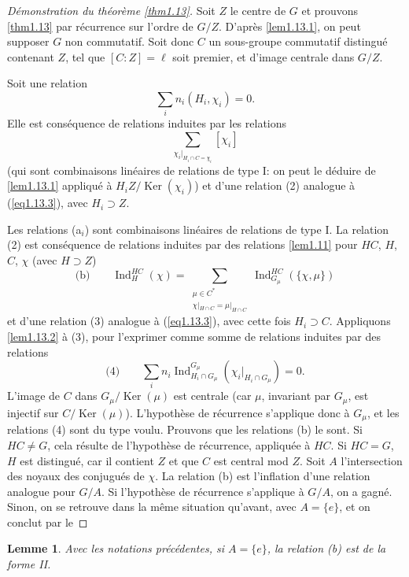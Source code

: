 \documentclass[11pt,a4paper]{amsart}
\theoremstyle{plain}
\newtheorem{lemma}[theorem]{Lemme}
\theoremstyle{definition}
\DeclareMathOperator{\Ind}{Ind}
\DeclareMathOperator{\Ker}{Ker}
\begin{document}
\begin{proof}[D\'emonstration du th\'eor\`eme \ref{thm1.13}]
Soit $Z$ le centre de $G$ et prouvons \ref{thm1.13} par r\'ecurrence sur l'ordre de $G/Z$. D'apr\`es \ref{lem1.13.1}, on peut supposer $G$ non commutatif. Soit donc $C$ un sous-groupe commutatif distingu\'e contenant $Z$, tel que $[C:Z] = \ell$ soit premier, et d'image centrale dans $G/Z$.

Soit une relation
\begin{equation}\label{eq1.13.3}
\sum_{i} n_{i} (H_{i},\chi_{i}) = 0.
\end{equation}
Elle est cons\'equence de relations induites par les relations
\[
\sum_{\chi_{i}|_{H_{i} \cap C = \chi_{i}}} [\chi_{i}]
\]
(qui sont combinaisons lin\'eaires de relations de type I: on peut le d\'eduire de \ref{lem1.13.1} appliqu\'e \`a $H_{i}Z/\Ker(\chi_{i})$) et d'une relation (2) analogue \`a (\ref{eq1.13.3}), avec $H_{i} \supset Z$.

Les relations (a$_{i}$) sont combinaisons lin\'eaires de relations de type I. La relation (2) est cons\'equence de relations induites par des relations \ref{lem1.11} pour $HC$, $H$, $C$, $\chi$ (avec $H \supset Z$)
\[
\text{(b)} \qquad \Ind_{H}^{HC}(\chi) = \sum_{\substack{\mu \in C^{*} \\ \chi|_{H \cap C} = \mu|_{H \cap C}}} \Ind_{G_{\mu}}^{HC}(\{\chi,\mu\})
\]
et d'une relation (3) analogue \`a (\ref{eq1.13.3}), avec cette fois $H_{i} \supset C$. Appliquons \ref{lem1.13.2} \`a (3), pour l'exprimer comme somme de relations induites par des relations
\[
\text{(4)} \qquad \sum_{i} n_{i} \Ind_{H_{i} \cap G_{\mu}}^{G_{\mu}}(\chi_{i}|_{H_{i} \cap G_{\mu}}) = 0.
\]
L'image de $C$ dans $G_{\mu}/\Ker(\mu)$ est centrale (car $\mu$, invariant par $G_{\mu}$, est injectif sur $C/\Ker(\mu)$). L'hypoth\`ese de r\'ecurrence s'applique donc \`a $G_{\mu}$, et les relations (4) sont du type voulu. Prouvons que les relations (b) le sont. Si $HC \not= G$, cela r\'esulte de l'hypoth\`ese de r\'ecurrence, appliqu\'ee \`a $HC$. Si $HC = G$, $H$ est distingu\'e, car il contient $Z$ et que $C$ est central mod $Z$. Soit $A$ l'intersection des noyaux des conjugu\'es de $\chi$. La relation (b) est l'inflation d'une relation analogue pour $G/A$. Si l'hypoth\`ese de r\'ecurrence s'applique \`a $G/A$, on a gagn\'e. Sinon, on se retrouve dans la m\^eme situation qu'avant, avec $A = \{e\}$, et on conclut par le
\end{proof}

\begin{lemma}\label{lem1.13.3}
Avec les notations pr\'ec\'edentes, si $A = \{e\}$, la relation (b) est de la forme \textup{II}.
\end{lemma}
\end{document}
